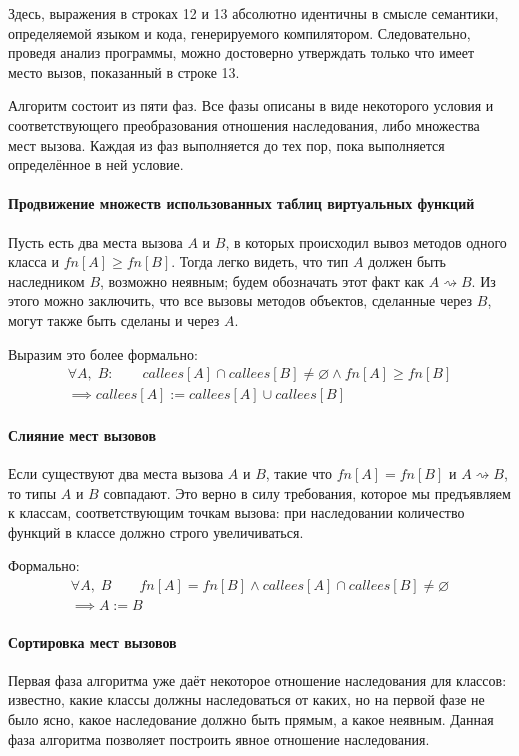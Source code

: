 \documentclass[a4paper,12pt,russian]{article}
\newcommand{\code}[1]{\textsf{#1}}
\begin{document}
Здесь, выражения в строках \code{12} и \code{13} абсолютно идентичны в смысле семантики, определяемой языком и кода, генерируемого компилятором.
Следовательно, проведя анализ программы, можно достоверно утверждать только что имеет место вызов, показанный в строке \code{13}.

Алгоритм состоит из пяти фаз.
Все фазы описаны в виде некоторого условия и соответствующего преобразования отношения наследования, либо множества мест вызова.
Каждая из фаз выполняется до тех пор, пока выполняется определённое в ней условие.

\paragraph{Продвижение множеств использованных таблиц виртуальных функций}
Пусть есть два места вызова $A$ и $B$, в которых происходил вывоз методов одного класса и $fn[A] \geq fn[B]$.
Тогда легко видеть, что тип $A$ должен быть наследником $B$, возможно неявным; будем обозначать этот факт как $A \rightsquigarrow B$.
Из этого можно заключить, что все вызовы методов объектов, сделанные через $B$, могут также быть сделаны и через $A$.

Выразим это более формально:
\begin{eqnarray*}
\forall A,\;B:\qquad callees[A] \cap callees[B] \neq \varnothing \wedge fn[A] \geq fn[B]\\
\implies callees[A] := callees[A] \cup callees[B]
\end{eqnarray*}

\paragraph{Слияние мест вызовов}
Если существуют два места вызова $A$ и $B$, такие что $fn[A] = fn[B]$ и $A \rightsquigarrow B$, то типы $A$ и $B$ совпадают.
Это верно в силу требования, которое мы предъявляем к классам, соответствующим точкам вызова: при наследовании количество функций в классе должно строго увеличиваться.

Формально:
\begin{eqnarray*}
\forall A,\;B\qquad fn[A] = fn[B] \wedge callees[A] \cap callees[B] \neq \varnothing\\
\implies A := B
\end{eqnarray*}

\paragraph{Сортировка мест вызовов}
Первая фаза алгоритма уже даёт некоторое отношение наследования для классов: известно, какие классы должны наследоваться от каких, но на первой фазе не было ясно, какое наследование должно быть прямым, а какое неявным. Данная фаза алгоритма позволяет построить явное отношение наследования.
\end{document}
